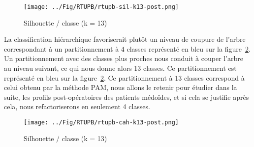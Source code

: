\begin{figure}[H]
\centering
\texttt{[image: ../Fig/RTUPB/rtupb-sil-k13-post.png]}
\caption{Silhouette / classe (k = 13)}
\label{fig-rtupb-post-pam-k13}
\end{figure}

La classification hiérarchique favoriserait plutôt un niveau de coupure de l'arbre correspondant à un partitionnement à 4 classes représenté en bleu sur la figure~\ref{fig-rtupb-post-cah}.
Un partitionnement avec des classes plus proches nous conduit à couper l'arbre au niveau suivant, ce qui
nous donne alors 13 classes. Ce partitionnement est représenté en bleu sur la figure~\ref{fig-rtupb-post-cah}.
Ce partitionnement à 13 classes correspond à celui obtenu par la méthode PAM, nous allons le retenir pour 
étudier dans la suite, les profils post-opératoires des patients médoïdes, et si cela se justifie après cela, nous refactoriserons en seulement 4 classes.

\begin{figure}[H]
\centering
\texttt{[image: ../Fig/RTUPB/rtupb-cah-k13-post.png]}
\caption{Silhouette / classe (k = 13)}
\label{fig-rtupb-post-cah}
\end{figure}


%
